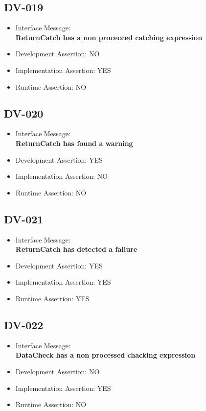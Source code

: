 \subsection{DV-019}
\begin{itemize}
  \item Interface Message:\\[1em]
    \textbf{ReturnCatch has a non procecced catching expression}
  \item Development Assertion: NO
  \item Implementation Assertion: YES
  \item Runtime Assertion: NO
\end{itemize}

\subsection{DV-020}
\begin{itemize}
  \item Interface Message:\\[1em]
    \textbf{ReturnCatch has found a warning}
  \item Development Assertion: YES
  \item Implementation Assertion: NO
  \item Runtime Assertion: NO
\end{itemize}

\subsection{DV-021}
\begin{itemize}
  \item Interface Message:\\[1em]
    \textbf{ReturnCatch has detected a failure}
  \item Development Assertion: YES
  \item Implementation Assertion: YES
  \item Runtime Assertion: YES
\end{itemize}

\subsection{DV-022}
\begin{itemize}
  \item Interface Message:\\[1em]
    \textbf{DataCheck has a non processed chacking expression}
  \item Development Assertion: NO
  \item Implementation Assertion: YES
  \item Runtime Assertion: NO
\end{itemize}

